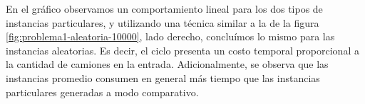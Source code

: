 En el gráfico observamos un comportamiento lineal para los dos tipos de instancias particulares, y utilizando una técnica similar a la de la figura \ref{fig:problema1-aleatoria-10000}, lado derecho, concluímos lo mismo para las instancias aleatorias. Es decir, el ciclo presenta un costo temporal proporcional a la cantidad de camiones en la entrada. Adicionalmente, se observa que las instancias promedio consumen en general más tiempo que las instancias particulares generadas a modo comparativo.






